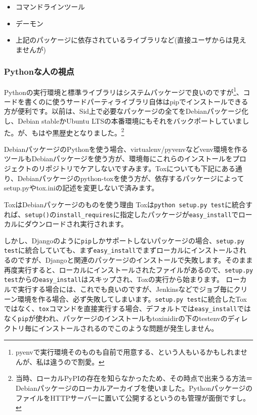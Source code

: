 \documentclass[mingoth,a4paper]{jsarticle}
\begin{document}
\begin{itemize}
\item コマンドラインツール
\item デーモン
\item 上記のパッケージに依存されているライブラリなど(直接ユーザからは見えませんが)
\end{itemize}

\subsubsection{Pythonな人の視点}

Pythonの実行環境と標準ライブラリはシステムパッケージで良いのですが\footnote{pyenvで実行環境そのものも自前で用意する、という人もいるかもしれませんが、私は違うので割愛。}、コードを書くのに使うサードパーティライブラリ自体はpipでインストールできる方が便利です。以前は、Sid上で必要なパッケージの全てをDebianパッケージ化し、Debian stableかUbuntu LTSの本番環境にもそれをバックポートしていました。が、もはや黒歴史となりました。\footnote{当時、ローカルPyPIの存在を知らなかったため、その時点で出来うる方法＝Debianパッケージのローカルアーカイブを使いました。PythonパッケージのファイルをHTTPサーバーに置いて公開するというのも管理が面倒ですし。}

DebianパッケージのPythonを使う場合、virtualenv/pyvenvなどvenv環境を作るツールもDebianパッケージを使う方が、環境毎にこれらのインストールをプロジェクトのリポジトリでケアしないですみます。Toxについても下記にある通り、Debianパッケージのpython-toxを使う方が、依存するパッケージによってsetup.pyやtox.iniの記述を変更しないで済みます。


{\scriptsize
  \begin{itembox}[l]{ToxはDebianパッケージのものを使う理由}
  Toxは\texttt{python setup.py test}に統合すれば、\texttt{setup()}の\texttt{install\_requires}に指定したパッケージが\texttt{easy\_install}でローカルにダウンロードされ実行されます。

  しかし、Djangoのように\texttt{pip}しかサポートしないパッケージの場合、\texttt{setup.py test}に統合していても、まず\texttt{easy\_install}でまずローカルにインストールされるのですが、Djangoと関連のパッケージのインストールで失敗します。そのまま再度実行すると、ローカルにインストールされたファイルがあるので、\texttt{setup.py test}からの\texttt{easy\_install}はスキップされ、Toxの実行から始まります。
  ローカルで実行する場合には、これでも良いのですが、Jenkinsなどでジョブ毎にクリーン環境を作る場合、必ず失敗してしまいます。\texttt{setup.py test}に統合したToxではなく、\texttt{tox}コマンドを直接実行する場合、デフォルトでは\texttt{easy\_install}ではなく\texttt{pip}が使われ、パッケージのインストールもtoxinidirの下のtestenvのディレクトリ毎にインストールされるのでこのような問題が発生しません。
\end{itembox}
}
\end{document}
